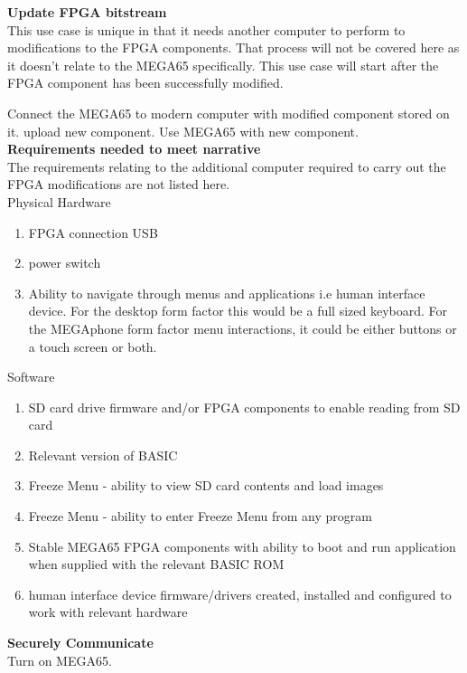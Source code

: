 \textbf{Update FPGA bitstream}\\
This use case is unique in that it needs another computer to perform to modifications to the FPGA components. That process will not be covered here as it doesn't relate to the MEGA65 specifically. This use case will start after the FPGA component has been successfully modified.

Connect the MEGA65 to modern computer with modified component stored on it. 
upload new component.
Use MEGA65 with new component.\\

\textbf{Requirements needed to meet narrative}\\
The requirements relating to the additional computer required to carry out the FPGA modifications are not listed here.\\
Physical Hardware
\begin{enumerate}
\item FPGA connection USB
\item power switch
\item Ability to navigate through menus and applications i.e human interface device. For the desktop form factor this would be a full sized keyboard. For the MEGAphone form factor menu interactions, it could be either buttons or a touch screen or both.
\end{enumerate}

Software\\
\begin{enumerate}
\item SD card drive firmware and/or FPGA components to enable reading from SD card
\item Relevant version of BASIC 
\item Freeze Menu - ability to view SD card contents and load images
\item Freeze Menu - ability to enter Freeze Menu from any program
\item Stable MEGA65 FPGA components with ability to boot and run application when supplied with the relevant BASIC ROM
\item human interface device firmware/drivers created, installed and configured to work with relevant hardware
\end{enumerate}

\textbf{Securely Communicate}\\
Turn on MEGA65.

